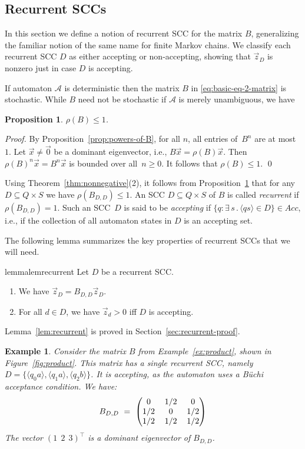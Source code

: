 \documentclass{elsarticle}
\newtheorem{proposition}[definition]{Proposition}
\newtheorem{example}[definition]{Example}
\def\<{\langle}
\def\>{\rangle}
\def\cA{\mathcal{A}}
\begin{document}
\subsection{Recurrent SCCs}
\label{sub:recurrent}
In this section we define a notion of recurrent SCC for the matrix
$B$, generalizing the familiar notion of the same name for finite
Markov chains.  We classify each recurrent SCC $D$ as either accepting
or non-accepting, showing that $\vec{z}_D$ is nonzero just in case
$D$ is accepting.

If automaton $\cA$ is deterministic then the matrix $B$ in
\eqref{eq:basic-eq-2-matrix} is stochastic.  While $B$ need not be
stochastic if $\cA$ is merely unambiguous, we have
\begin{proposition} \label{prop:spectral-radius-le-1}
  $\rho(B) \leqslant 1$.
\end{proposition}
\begin{proof}
By Proposition~\ref{prop:powers-of-B}, for all $n$, all entries of~$B^n$ are at most~$1$.
Let $\vec{x} \ne \vec{0}$ be a dominant eigenvector, i.e., $B \vec{x} = \rho(B) \vec{x}$.
Then $\rho(B)^n \vec{x} = B^n \vec{x}$ is bounded over all~$n \geqslant 0$.
It follows that $\rho(B) \leqslant 1$.
\qed
\end{proof}

Using Theorem~\ref{thm:nonnegative}(2), it follows from
Proposition~\ref{prop:spectral-radius-le-1} that for any
$D \subseteq Q \times S$ we have $\rho(B_{D,D}) \leqslant 1$.  An SCC
$D \subseteq Q \times S$ of $B$ is called \emph{recurrent} if
$\rho(B_{D,D}) = 1$.  Such an SCC~$D$ is said to be \emph{accepting} if
$\{ q : \exists\, s\,.\, \<q s\> \in D \} \in Acc$, i.e., if the collection
of all automaton states in $D$ is an accepting set.

The following lemma summarizes the key properties of recurrent SCCs
that we will need.
\begin{restatable}{lemma}{lemrecurrent}\label{lem:recurrent}\label{LEM:RECURRENT}
  Let $D$ be a recurrent SCC.
\begin{enumerate}
\item We have $\vec{z}_D = B_{D,D} \vec{z}_D$.
\item For all $d \in D$, we have $\vec{z}_d > 0$ iff $D$ is accepting.
\end{enumerate}
\end{restatable}
\noindent Lemma~\ref{lem:recurrent} is proved in Section~\ref{sec:recurrent-proof}.

\begin{example}
Consider the matrix $B$ from Example~\ref{ex:product}, shown in
Figure~\ref{fig:product}.  This matrix has a single recurrent SCC,
namely $D = \{\<q_0a\>,\<q_1a\>,\<q_2b\>\}$.
It is accepting, as the automaton uses a B\"uchi acceptance condition.
We have:
\[
B_{D,D} \ = \
\begingroup \setlength\arraycolsep{6pt}
\begin{pmatrix}
0 & 1/2 & 0 \\
1/2 & 0 & 1/2 \\
1/2 & 1/2 & 1/2
\end{pmatrix}
\endgroup
\]
The vector $(1 \ \ 2 \ \ 3 )^\top$ is a dominant eigenvector of $B_{D,D}$.
\end{example}
\end{document}
